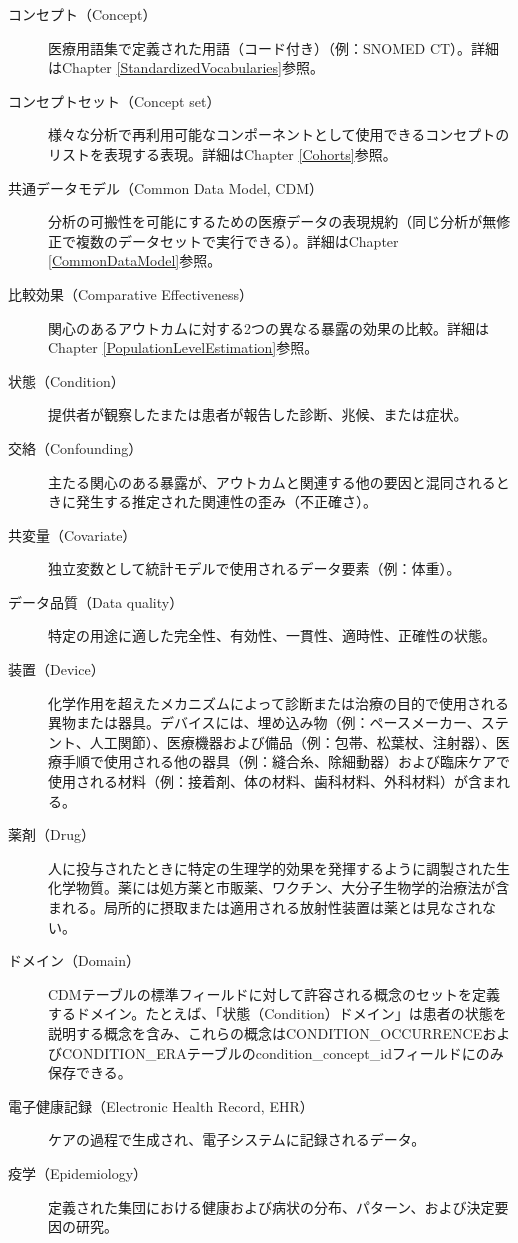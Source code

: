 \documentclass[
  11pt]{book}
\theoremstyle{definition}
\theoremstyle{definition}
\theoremstyle{definition}
\theoremstyle{definition}
\theoremstyle{remark}
\begin{document}
\begin{description}
\item[コンセプト（Concept）]
医療用語集で定義された用語（コード付き）（例：SNOMED CT）。詳細はChapter \ref{StandardizedVocabularies}参照。
\item[コンセプトセット（Concept set）]
様々な分析で再利用可能なコンポーネントとして使用できるコンセプトのリストを表現する表現。詳細はChapter \ref{Cohorts}参照。
\item[共通データモデル（Common Data Model, CDM）]
分析の可搬性を可能にするための医療データの表現規約（同じ分析が無修正で複数のデータセットで実行できる）。詳細はChapter \ref{CommonDataModel}参照。
\item[比較効果（Comparative Effectiveness）]
関心のあるアウトカムに対する2つの異なる暴露の効果の比較。詳細はChapter \ref{PopulationLevelEstimation}参照。
\item[状態（Condition）]
提供者が観察したまたは患者が報告した診断、兆候、または症状。
\item[交絡（Confounding）]
主たる関心のある暴露が、アウトカムと関連する他の要因と混同されるときに発生する推定された関連性の歪み（不正確さ）。
\item[共変量（Covariate）]
独立変数として統計モデルで使用されるデータ要素（例：体重）。
\item[データ品質（Data quality）]
特定の用途に適した完全性、有効性、一貫性、適時性、正確性の状態。
\item[装置（Device）]
化学作用を超えたメカニズムによって診断または治療の目的で使用される異物または器具。デバイスには、埋め込み物（例：ペースメーカー、ステント、人工関節）、医療機器および備品（例：包帯、松葉杖、注射器）、医療手順で使用される他の器具（例：縫合糸、除細動器）および臨床ケアで使用される材料（例：接着剤、体の材料、歯科材料、外科材料）が含まれる。
\item[薬剤（Drug）]
人に投与されたときに特定の生理学的効果を発揮するように調製された生化学物質。薬には処方薬と市販薬、ワクチン、大分子生物学的治療法が含まれる。局所的に摂取または適用される放射性装置は薬とは見なされない。
\item[ドメイン（Domain）]
CDMテーブルの標準フィールドに対して許容される概念のセットを定義するドメイン。たとえば、「状態（Condition）ドメイン」は患者の状態を説明する概念を含み、これらの概念はCONDITION\_OCCURRENCEおよびCONDITION\_ERAテーブルのcondition\_concept\_idフィールドにのみ保存できる。
\item[電子健康記録（Electronic Health Record, EHR）]
ケアの過程で生成され、電子システムに記録されるデータ。
\item[疫学（Epidemiology）]
定義された集団における健康および病状の分布、パターン、および決定要因の研究。

\end{description}
\end{document}
